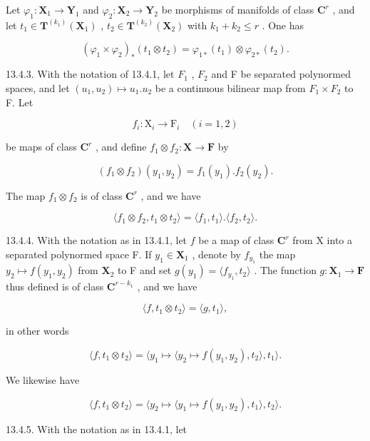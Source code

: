 Let \(\varphi_{1}\colon\mathbf{X}_{1}\to\mathbf{Y}_{1}\) and \(\varphi_{2}\colon\mathbf{X}_{2}\to\mathbf{Y}_{2}\) be morphisms of manifolds of class \(\mathbf{C}^{r}\) , and let \(t_{1}\in\mathbf{T}^{(k_{1})}(\mathbf{X}_{1})\) , \(t_{2}\in\mathbf{T}^{(k_{2})}(\mathbf{X}_{2})\) with \(k_{1}+k_{2}\leqslant r\) . One has

\[
(\varphi_ {1} \times \varphi_ {2}) _ {*} (t _ {1} \otimes t _ {2}) = \varphi_ {1 *} (t _ {1}) \otimes \varphi_ {2 *} (t _ {2}).
\]

13.4.3. With the notation of 13.4.1, let \(F_{1}\) , \(F_{2}\) and F be separated polynormed spaces, and let \((u_{1}, u_{2}) \mapsto u_{1}.u_{2}\) be a continuous bilinear map from \(F_{1} \times F_{2}\) to F. Let

\[
f _ {i} \colon \mathrm{X} _ {i} \rightarrow \mathrm{F} _ {i} \quad (i = 1, 2)
\]

be maps of class \(\mathbf{C}^r\) , and define \(f_1 \otimes f_2: \mathbf{X} \to \mathbf{F}\) by

\[
(f _ {1} \otimes f _ {2}) (y _ {1}, y _ {2}) = f _ {1} (y _ {1}). f _ {2} (y _ {2}).
\]

The map \(f_{1} \otimes f_{2}\) is of class \(\mathbf{C}^{r}\) , and we have

\[
\langle f _ {1} \otimes f _ {2}, t _ {1} \otimes t _ {2} \rangle = \langle f _ {1}, t _ {1} \rangle . \langle f _ {2}, t _ {2} \rangle .
\]

13.4.4. With the notation as in 13.4.1, let \(f\) be a map of class \(\mathbf{C}^{r}\) from X into a separated polynormed space F. If \(y_{1} \in \mathbf{X}_{1}\) , denote by \(f_{y_{1}}\) the map \(y_{2} \mapsto f(y_{1}, y_{2})\) from \(\mathbf{X}_{2}\) to F and set \(g(y_{1}) = \langle f_{y_{1}}, t_{2} \rangle\) . The function \(g: \mathbf{X}_{1} \to \mathbf{F}\) thus defined is of class \(\mathbf{C}^{r - k_{1}}\) , and we have

\[
\langle f, t _ {1} \otimes t _ {2} \rangle = \langle g, t _ {1} \rangle ,
\]

in other words

\[
\langle f, t _ {1} \otimes t _ {2} \rangle = \langle y _ {1} \mapsto \langle y _ {2} \mapsto f (y _ {1}, y _ {2}), t _ {2} \rangle , t _ {1} \rangle .
\]

We likewise have

\[
\langle f, t _ {1} \otimes t _ {2} \rangle = \langle y _ {2} \mapsto \langle y _ {1} \mapsto f (y _ {1}, y _ {2}), t _ {1} \rangle , t _ {2} \rangle .
\]

13.4.5. With the notation as in 13.4.1, let

